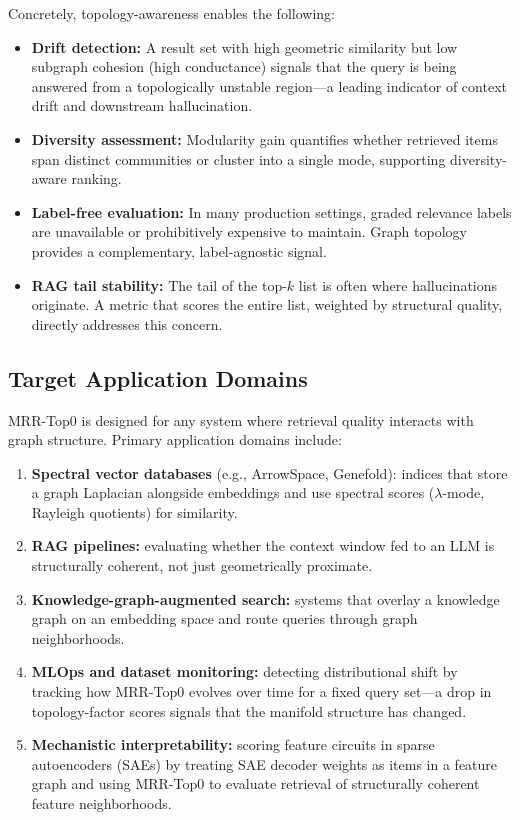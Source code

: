 \documentclass[11pt,a4paper]{article}
\begin{document}
Concretely, topology-awareness enables the following:
\begin{itemize}[nosep]
  \item \textbf{Drift detection:} A result set with high geometric
    similarity but low subgraph cohesion (high conductance) signals that
    the query is being answered from a topologically unstable region---a
    leading indicator of context drift and downstream hallucination.
  \item \textbf{Diversity assessment:} Modularity gain quantifies whether
    retrieved items span distinct communities or cluster into a single
    mode, supporting diversity-aware ranking.
  \item \textbf{Label-free evaluation:} In many production settings,
    graded relevance labels are unavailable or prohibitively expensive
    to maintain.  Graph topology provides a complementary,
    label-agnostic signal.
  \item \textbf{RAG tail stability:} The tail of the top-$k$ list is
    often where hallucinations originate.  A metric that scores the
    entire list, weighted by structural quality, directly addresses
    this concern.
\end{itemize}

\subsection{Target Application Domains}

MRR-Top0 is designed for any system where retrieval quality interacts with
graph structure.  Primary application domains include:

\begin{enumerate}[nosep]
  \item \textbf{Spectral vector databases} (e.g., ArrowSpace, Genefold):
    indices that store a graph Laplacian alongside embeddings and use
    spectral scores ($\lambda$-mode, Rayleigh quotients) for similarity.
  \item \textbf{RAG pipelines:} evaluating whether the context window fed
    to an LLM is structurally coherent, not just geometrically proximate.
  \item \textbf{Knowledge-graph-augmented search:} systems that overlay
    a knowledge graph on an embedding space and route queries through
    graph neighborhoods.
  \item \textbf{MLOps and dataset monitoring:} detecting distributional
    shift by tracking how MRR-Top0 evolves over time for a fixed query
    set---a drop in topology-factor scores signals that the manifold
    structure has changed.
  \item \textbf{Mechanistic interpretability:} scoring feature circuits
    in sparse autoencoders (SAEs) by treating SAE decoder weights as
    items in a feature graph and using MRR-Top0 to evaluate retrieval
    of structurally coherent feature neighborhoods.
\end{enumerate}
\end{document}
